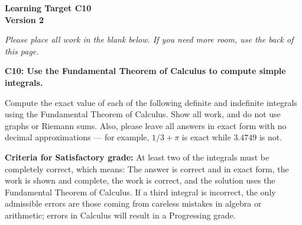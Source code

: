 \documentclass[10pt]{article}
\begin{document}
	\vspace*{0in}

		\begin{center}
			\textbf{Learning Target C10 \\
			Version 2} \\
		\end{center}

\emph{Please place all work in the blank below. If you need more room, use the back of this page.}

\begin{framed}
	\textbf{\textbf{C10:} Use the Fundamental Theorem of Calculus to compute simple integrals.}
\end{framed}

Compute the exact value of each of the following definite and indefinite integrals using the Fundamental Theorem of Calculus. Show all work, and do not use graphs or Riemann sums. Also, please leave all answers in exact form with no decimal approximations --- for example, $1/3 + \pi$ is exact while $3.4749$ is not. 


\begin{enumerate}
    \item $\displaystyle{\int_1^3 (x^2 + 1) \, dx}$
    \item $\displaystyle{\int_0^{\pi/2} \sin(t) \, dt$
    \item $\displaystyle{\int_1^2 (\sqrt{x} - x^2) \, dx}$
\end{enumerate}

\vfill


\begin{small}
    \begin{framed}
        	\textbf{Criteria for Satisfactory grade:} At least two of the integrals must be completely correct, which means: The answer is correct and in exact form, the work is shown and complete, the work is correct, and the solution uses the Fundamental Theorem of Calculus. If a third integral is incorrect, the only admissible errors are those coming from careless mistakes in algebra or arithmetic; errors in Calculus will result in a Progressing grade. 
    \end{framed}

\end{small}
\end{document}
